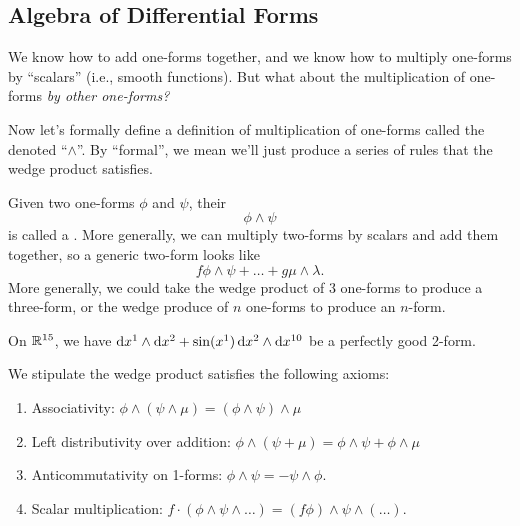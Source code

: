 \subsection{Algebra of Differential Forms}

\M
We know how to add one-forms together, and we know how to multiply
one-forms by ``scalars'' (i.e., smooth functions). But what about the
multiplication of one-forms \emph{by other one-forms?}

Now let's formally define a definition of multiplication of one-forms
called the  denoted ``$\wedge$''. By ``formal'',
we mean we'll just produce a series of rules that the wedge product
satisfies.

Given two one-forms $\phi$ and $\psi$, their 
\begin{equation}
\phi\wedge\psi
\end{equation}
is called a . More generally, we can multiply two-forms
by scalars and add them together, so a generic two-form looks like
\begin{equation}
f\phi\wedge\psi+\dots+g\mu\wedge\lambda.
\end{equation}
More generally, we could take the wedge product of 3 one-forms to
produce a three-form, or the wedge produce of $n$ one-forms to produce
an $n$-form.

\begin{example}
On $\mathbb{R}^{15}$, we have $\mathrm{d} x^{1}\wedge\mathrm{d} x^{2}+\sin(x^{1})\,\mathrm{d} x^{2}\wedge\mathrm{d} x^{10}$
be a perfectly good 2-form.
\end{example}

We stipulate the wedge product satisfies the following axioms:
\begin{enumerate}
\item Associativity: $\phi\wedge(\psi\wedge\mu)=(\phi\wedge\psi)\wedge\mu$
\item Left distributivity over addition: $\phi\wedge(\psi+\mu) = \phi\wedge\psi+\phi\wedge\mu$
\item Anticommutativity on 1-forms: $\phi\wedge\psi=-\psi\wedge\phi$.
\item Scalar multiplication: $f\cdot(\phi\wedge\psi\wedge\dots)=(f\phi)\wedge\psi\wedge(\dots)$.
\end{enumerate}

